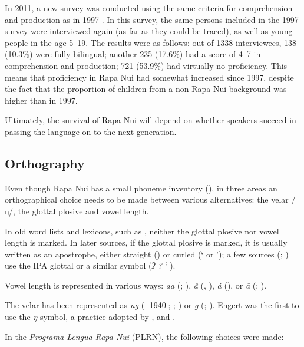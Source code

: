 In 2011, a new survey was conducted using the same criteria for comprehension and production as in 1997 \citep{CalderónHaoaMakihara2011}. In this survey, the same persons included in the 1997 survey were interviewed again (as far as they could be traced), as well as young people in the age 5–19. The results were as follows: out of 1338 interviewees, 138 (10.3\%) were fully bilingual; another 235 (17.6\%) had a score of 4–7 in comprehension and production; 721 (53.9\%) had virtually no proficiency. This means that proficiency in Rapa Nui had somewhat increased since 1997, despite the fact that the proportion of children from a non-Rapa Nui background was higher than in 1997.

Ultimately, the survival of Rapa Nui will depend on whether speakers succeed in passing the language on to the next generation.

\subsection{Orthography}\label{sec:1.4.4}

Even though Rapa Nui has a small phoneme inventory (), in three areas an orthographical choice needs to be made between various alternatives: the velar  /ŋ/, the glottal plosive  and vowel length. 

In old word lists and lexicons, such as \citet{Roussel1908}, neither the glottal plosive nor vowel length is marked. In later sources, if the glottal plosive is marked, it is usually written as an apostrophe, either straight ({\ꞌ}) or curled (‘ or ’); a few sources (\citealt{Fuentes1960}; \citealt{Salas1973}) use the IPA glottal or a similar symbol (\textit{ʔ} \textit{?} \textit{ˀ} ). 

Vowel length is represented in various ways: \textit{aa} (\citealt{Fuentes1960}; \citealt{Salas1973}), \textit{â} (\citealt{Englert1978}, \citealt{ConteOliveros1996}), \textit{á} (\citealt{DuFeu1996}), or \textit{ā} (\citealt{Blixen1972}; \citealt{Chapin1978}). 

The velar  has been represented as \textit{ng} (\citealt{Métraux1971} [1940]; \citealt{Blixen1972}; \citealt{ConteOliveros1996}) or \textit{g} (\citealt{Roussel1908}; \citealt{Chapin1978}). Engert was the first to use the \textit{ŋ} symbol, a practice adopted by \citet{Fuentes1960}, \citet{Salas1973} and \citet{DuFeu1996}.

In the \textit{Programa Lengua Rapa Nui} (PLRN), the following choices were made:

